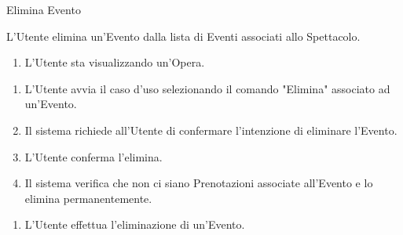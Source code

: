 {\ucExtTable	%
{	%
	Elimina Evento
	
}{	%
	
}{	%
	L'Utente elimina un'Evento dalla lista di Eventi associati allo Spettacolo.
	
}{	%
	\attori
	
}{	%
	\begin{enumerate}
        \item L'Utente sta visualizzando un'Opera.
    \end{enumerate}
	
}{	%
	\begin{enumerate}
        \item L'Utente avvia il caso d'uso selezionando il comando "Elimina" associato ad un'Evento.
        \item Il sistema richiede all'Utente di confermare l'intenzione di eliminare l'Evento.
        \item L'Utente conferma l'elimina.
        \item Il sistema verifica che non ci siano Prenotazioni associate all'Evento e lo elimina permanentemente.
    \end{enumerate}
	
}{	%
	\begin{enumerate}
        \item L'Utente effettua l'eliminazione di un'Evento.
    \end{enumerate}
	
} }

